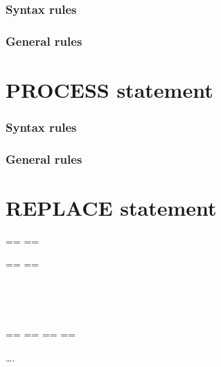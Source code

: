\begin{syntax}
  \directiveindicator{}
  \begin{0-1}
  \end{0-1}
\end{syntax}

\subsubsection{Syntax rules}

\subsubsection{General rules}

\section{PROCESS statement}

\begin{syntax}
\end{syntax}

\subsubsection{Syntax rules}

\subsubsection{General rules}

\section{REPLACE statement}

\begin{syntax}
  \begin{0-1}
  \end{0-1}
  \begin{1=}
    \begin{1=}
      == \pseudotext == \\
      \identifier
    \end{1=}
    \begin{1=}
      == \pseudotext == \\
      \identifier
    \end{1=} \\

    \begin{1=}
       \\
    \end{1=}
    ==  ==
    ==  ==
  \end{1=}\ldots .
\end{syntax}

